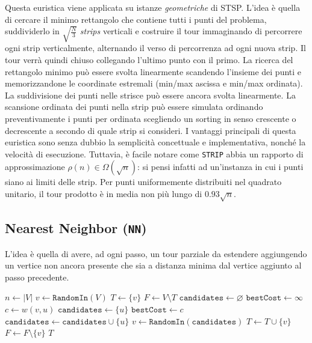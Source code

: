 Questa euristica viene applicata su istanze \textit{geometriche} di STSP. L'idea è quella
di cercare il minimo rettangolo che contiene tutti i punti del problema, suddividerlo in $\sqrt{\frac{N}{3}}$
\textit{strips} verticali e costruire il tour immaginando di percorrere ogni strip verticalmente, alternando il
verso di percorrenza ad ogni nuova strip. Il tour verrà quindi chiuso collegando l'ultimo punto con il primo.
La ricerca del rettangolo minimo può essere svolta linearmente scandendo l'insieme dei punti e memorizzandone
le coordinate estremali (min/max ascissa e min/max ordinata). La suddivisione dei punti nelle strisce può
essere ancora svolta linearmente. La scansione ordinata dei punti nella strip può essere simulata
ordinando preventivamente i punti per ordinata scegliendo un sorting in senso crescente o decrescente
a secondo di quale strip si consideri. I vantaggi principali di questa euristica sono senza dubbio la semplicità
concettuale e implementativa, nonché la velocità di esecuzione. Tuttavia, è facile notare come \texttt{STRIP}
abbia un rapporto di approssimazione $\rho(n) \in \Omega(\sqrt{n})$: si pensi infatti ad un'instanza in cui i punti
siano ai limiti delle strip. Per punti uniformemente distribuiti nel quadrato unitario, il
tour prodotto è in media non più lungo di $0.93\sqrt{n}$\cite{STRIP}.
\ \\

\subsection{Nearest Neighbor (\texttt{NN})}

L'idea è quella di avere, ad ogni passo, un tour parziale da estendere
aggiungendo un vertice non ancora presente che sia a distanza minima dal vertice aggiunto al passo precedente.

\begin{algorithm}[H]
\caption{}
\begin{algorithmic}[1]
    \State $n \gets |V|$
    \State $v \gets \texttt{RandomIn}(V)$
    \State $T \gets \{v\}$
    \State $F \gets V \setminus T$
        \State $\texttt{candidates} \gets \varnothing$
        \State $\texttt{bestCost} \gets \infty$
            \State $c \gets w(v,u)$
                \State $\texttt{candidates} \gets \{u\}$
                \State $\texttt{bestCost} \gets c$
                \State $\texttt{candidates} \gets \texttt{candidates} \cup \{u\}$
            \EndIf
        \EndFor
        \State $v \gets \texttt{RandomIn}(\texttt{candidates})$
        \State $T \gets T \cup \{v\}$
        \State $F \gets F \setminus \{v\}$
    \EndFor
    \State
    \State \Return $T$
\EndFunction
\end{algorithmic}
\end{algorithm}

